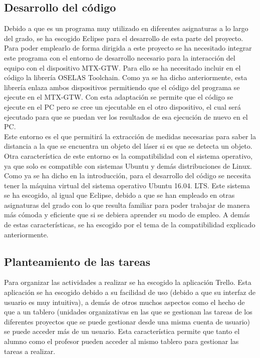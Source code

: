 \subsection{Desarrollo del código}

Debido a que es un programa muy utilizado en diferentes asignaturas a lo largo del grado, se ha escogido Eclipse para el desarrollo de esta parte del proyecto. Para poder emplearlo de forma dirigida a este proyecto se ha necesitado integrar este programa con el entorno de desarrollo necesario para la interacción del equipo con el dispositivo  MTX-GTW. Para ello se ha necesitado incluir en el código la librería OSELAS Toolchain. Como ya se ha dicho anteriormente, esta librería enlaza ambos dispositivos permitiendo que el código del programa se ejecute en el  MTX-GTW. Con esta adaptación se permite que el código se ejecute en el PC pero se cree un ejecutable en el otro dispositivo, el cual será ejecutado para que se puedan ver los resultados de esa ejecución de nuevo en el PC.\\

Este entorno es el que permitirá la extracción de medidas necesarias para saber la distancia a la que se encuentra un objeto del láser si es que se detecta un objeto. Otra característica de este entorno es la compatibilidad con el sistema operativo, ya que solo es compatible con sistemas Ubuntu y demás distribuciones de Linux. \\

Como ya se ha dicho en la introducción,  para el desarrollo del código se necesita tener la máquina virtual del sistema operativo Ubuntu 16.04. LTS. Este sistema se ha escogido, al igual que Eclipse, debido a que se han empleado en otras asignaturas del grado con lo que resulta familiar para poder trabajar de manera más cómoda y eficiente que si se debiera aprender su modo de empleo. A demás de estas características, se ha escogido por el tema de la compatibilidad explicado anteriormente.\\

\subsection{Planteamiento de las tareas}

Para organizar las actividades a realizar se ha escogido la aplicación Trello. Esta aplicación se ha escogido debido a su facilidad de uso (debido a que su interfaz de usuario es muy intuitiva), a demás de otros muchos aspectos como el hecho de que a un tablero (unidades organizativas en las que se gestionan las tareas de los diferentes proyectos que se puede gestionar desde una misma cuenta de usuario) se puede acceder más de un usuario. Esta característica permite que tanto el alumno como el profesor pueden acceder al mismo tablero para gestionar las tareas a realizar.


